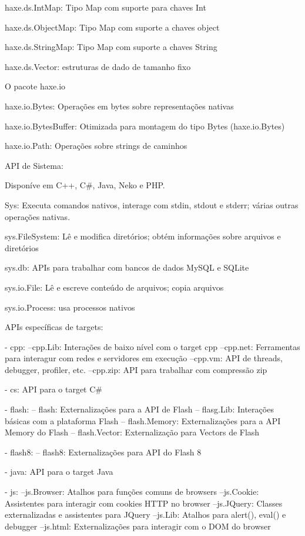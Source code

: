 haxe.ds.IntMap: Tipo Map com suporte para chaves Int

haxe.ds.ObjectMap: Tipo Map com suporte a chaves object

haxe.ds.StringMap: Tipo Map com suporte a chaves String

haxe.ds.Vector: estruturas de dado de tamanho fixo

O pacote haxe.io 

haxe.io.Bytes: Operações em bytes sobre representações nativas

haxe.io.BytesBuffer: Otimizada para montagem do tipo Bytes (haxe.io.Bytes)

haxe.io.Path: Operações sobre strings de caminhos

API de Sistema:

Disponíve em C++, C#, Java, Neko e PHP.

Sys: Executa comandos nativos, interage com stdin, stdout e stderr; várias outras operações nativas.

sys.FileSystem: Lê e modifica diretórios; obtém informações sobre arquivos e diretórios

sys.db: APIs para trabalhar com bancos de dados MySQL e SQLite

sys.io.File: Lê e escreve conteúdo de arquivos; copia arquivos

sys.io.Process: usa processos nativos

APIs específicas de targets:

- cpp:
 --cpp.Lib: Interações de baixo nível com o target cpp
 --cpp.net: Ferramentas para interagur com redes e servidores em execução
 --cpp.vm: API de threads, debugger, profiler, etc.
 --cpp.zip: API para trabalhar com compressão zip

- cs: API para o target C#

- flash:
 -- flash: Externalizações para a API de Flash
 -- flasg.Lib: Interações básicas com a plataforma Flash
 -- flash.Memory: Externalizações para a API Memory do Flash
 -- flash.Vector: Externalização para Vectors de Flash

- flash8:
 -- flash8: Externalizações para API do Flash 8

- java: API para o target Java

- js:
 --js.Browser: Atalhos para funções comuns de browsers
 --js.Cookie: Assistentes para interagir com cookies HTTP no browser
 --js.JQuery: Classes externalizadas e assistentes para JQuery
 --js.Lib: Atalhos para alert(), eval() e debugger
 --js.html: Externalizações para interagir com o DOM do browser

